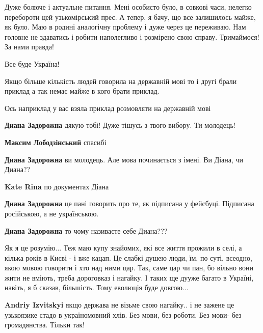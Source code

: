 \begin{itemize}
\begin{itemize}

Дуже болюче і актуальне питання. Мені особисто було, в совкові часи, нелегко
перебороти цей узькомірський прес. А тепер, я бачу, що все залишилось майже, як
було. Маю в родині аналогічну проблему і дуже через це переживаю. Нам головне
не здаватись і робити наполегливо і розмірено свою справу. Тримаймося! За нами
правда!

Все буде Україна!

\end{itemize} %


Якщо більше кількість людей говорила на державній мові то і другі брали приклад
а так немає майже в кого брати приклад.

Ось наприклад у вас взяла приклад розмовляти на державній мові

\begin{itemize} %
\textbf{Диана Задорожна} дякую тобі! Дуже тішусь з твого вибору. Ти молодець!

\textbf{Максим Лободзінський} спасибі

\textbf{Диана Задорожна} ви молодець. Але мова починається з імені. Ви Діана, чи Диана??

\textbf{Kate Rina} по документах Діана

\textbf{Диана Задорожна} це пані говорить про те, як підписана у фейсбуці. Підписана російською, а не українською.

\textbf{Диана Задорожна} то чому називаєте себе Диана???
\end{itemize} %


Як я це розумію... Теж маю купу знайомих, які все життя прожили в селі, а
кілька років в Києві - і вже кацап. Це слабкі душею люди, їм, по суті, всеодно,
якою мовою говорити і хто над ними цар. Так, саме цар чи пан, бо вільно вони
жити не вміють, треба дороговказ і нагайку. І таких ще дууже багато в Україні,
навіть, я б сказав, більшість. Тому еволюція буде довгою...

\begin{itemize} %
\textbf{Andriy Izvitskyi} якщо держава не візьме свою нагайку.. і не зажене це узькоязике стадо в україномовний хлів. Без мови, без роботи. Без мови- без громадянства. Тільки так!


\end{itemize}
\end{itemize}
